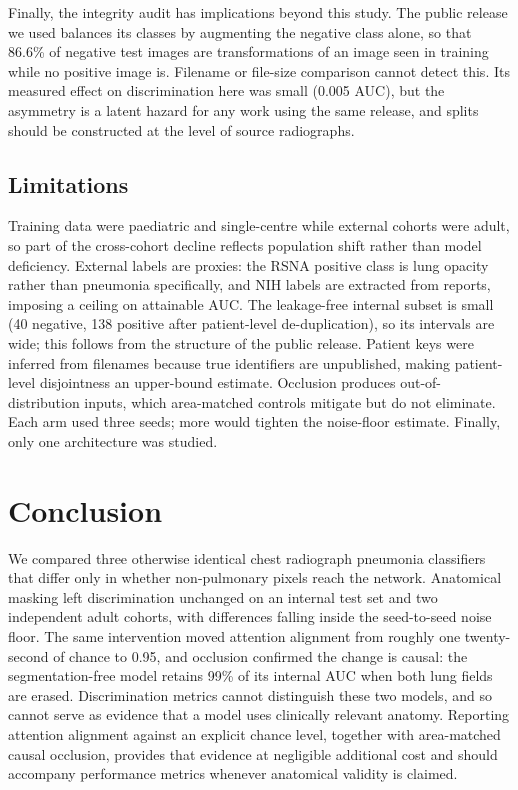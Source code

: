 \documentclass[journal,twoside,web]{ieeecolor}
\begin{document}
Finally, the integrity audit has implications beyond this study. The public release we used balances its classes by augmenting the negative class alone, so that 86.6\% of negative test images are transformations of an image seen in training while no positive image is. Filename or file-size comparison cannot detect this. Its measured effect on discrimination here was small (0.005 AUC), but the asymmetry is a latent hazard for any work using the same release, and splits should be constructed at the level of source radiographs.

\subsection{Limitations}
\label{sec:limits}

Training data were paediatric and single-centre while external cohorts were adult, so part of the cross-cohort decline reflects population shift rather than model deficiency. External labels are proxies: the RSNA positive class is lung opacity rather than pneumonia specifically, and NIH labels are extracted from reports, imposing a ceiling on attainable AUC\@. The leakage-free internal subset is small (40 negative, 138 positive after patient-level de-duplication), so its intervals are wide; this follows from the structure of the public release. Patient keys were inferred from filenames because true identifiers are unpublished, making patient-level disjointness an upper-bound estimate. Occlusion produces out-of-distribution inputs, which area-matched controls mitigate but do not eliminate. Each arm used three seeds; more would tighten the noise-floor estimate. Finally, only one architecture was studied.

\section{Conclusion}
\label{sec:conclusion}

We compared three otherwise identical chest radiograph pneumonia classifiers that differ only in whether non-pulmonary pixels reach the network. Anatomical masking left discrimination unchanged on an internal test set and two independent adult cohorts, with differences falling inside the seed-to-seed noise floor. The same intervention moved attention alignment from roughly one twenty-second of chance to 0.95, and occlusion confirmed the change is causal: the segmentation-free model retains 99\% of its internal AUC when both lung fields are erased. Discrimination metrics cannot distinguish these two models, and so cannot serve as evidence that a model uses clinically relevant anatomy. Reporting attention alignment against an explicit chance level, together with area-matched causal occlusion, provides that evidence at negligible additional cost and should accompany performance metrics whenever anatomical validity is claimed.
\end{document}
